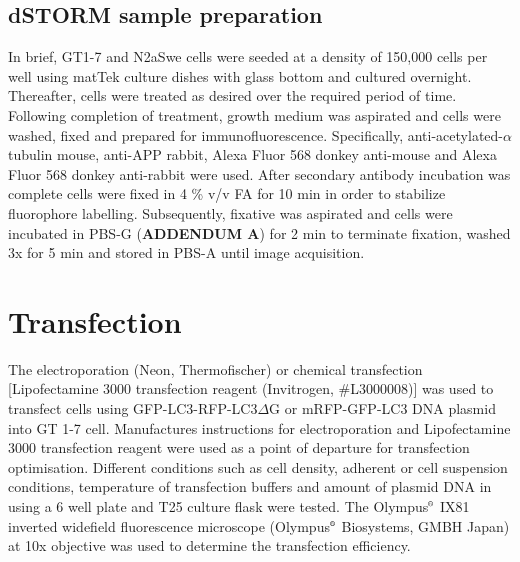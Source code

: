 \subsection{dSTORM sample preparation}
In brief, GT1-7 and N2aSwe cells were seeded at a density of 150,000 cells per well using matTek culture dishes with glass bottom and cultured overnight. Thereafter, cells were treated as desired over the required period of time. Following completion of treatment, growth medium was aspirated and cells were washed, fixed and prepared for immunofluorescence. Specifically, anti-acetylated-$\alpha$ tubulin mouse, anti-APP rabbit, Alexa Fluor 568 donkey anti-mouse and Alexa Fluor 568 donkey anti-rabbit were used. After secondary antibody incubation was complete cells were fixed in 4 \% v/v FA for 10 min in order to stabilize fluorophore labelling. Subsequently, fixative was aspirated and cells were incubated in PBS-G (\textbf{ADDENDUM A}) for 2 min to terminate fixation, washed 3x for 5 min and stored in PBS-A until image acquisition. 

\section{Transfection}\label{sec:transfection}
The electroporation (Neon, Thermofischer) or chemical transfection [Lipofectamine 3000 transfection reagent (Invitrogen, \#L3000008)] was used to transfect cells using GFP-LC3-RFP-LC3$\Delta$G or mRFP-GFP-LC3 DNA plasmid into GT 1-7 cell. Manufactures instructions for electroporation and Lipofectamine 3000 transfection reagent were used as a point of departure for transfection optimisation. Different conditions such as cell density, adherent or cell suspension conditions, temperature of transfection buffers and amount of plasmid DNA in using a 6 well plate and T25 culture flask were tested. The Olympus${\textsuperscript{\tiny{\textregistered}}}$ IX81 inverted widefield fluorescence microscope (Olympus${\textsuperscript{\tiny{\textregistered}}}$ Biosystems, GMBH Japan) at 10x objective was used to determine the transfection efficiency.

